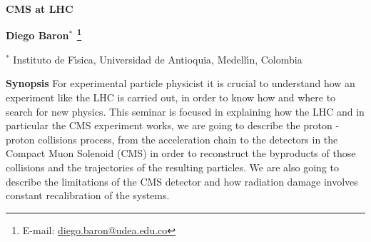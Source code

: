 \documentclass[a4paper,11pt]{article}
\newcommand{\abstracttitle}[1]{
 \begin{center}{\Large {\bf #1}}\end{center}
}
\newcommand{\authors}[1]{
 \vspace*{-0.3cm}
 \begin{center} {\bf #1} \end{center}
 \vspace*{-0.3cm}
}
\newcommand{\addresses}[1]{
 \begin{center} {\small #1} \end{center}
}
\newcommand{\synopsis}[1]{
 \begin{center}
 \setstretch{0.75}
 \begin{minipage}[t]{16cm}
   {\footnotesize {\bf Synopsis} #1 }
 \end{minipage}
 \setstretch{1.0}
 \end{center}
}
\newcommand{\writeto}[1]{
 \hspace*{-2.5mm} \footnote{E-mail: \href{mailto:#1}{#1}}\hspace*{-1.5mm}
}
\begin{document}
\abstracttitle{
	CMS at LHC
}

\authors{
	Diego Baron$^{\ast}$\writeto{diego.baron@udea.edu.co}
}
\addresses{
	$^\ast$ Instituto de F\'{\i}sica, Universidad de Antioquia, Medell\'{\i}n, Colombia \\
}
\synopsis{
	For experimental particle physicist it is crucial to understand how an experiment like the LHC is carried out, in order to know how and where to search for new physics. This seminar is focused in explaining how the LHC and in particular the CMS experiment works, we are going to describe the proton - proton collisions process, from the acceleration chain to the detectors in the Compact Muon Solenoid (CMS) in order to reconstruct the byproducts of those collisions and the trajectories of the resulting particles. We are also going to describe the limitations of the CMS detector and how radiation damage involves constant recalibration of the systems.
}
\end{document}
